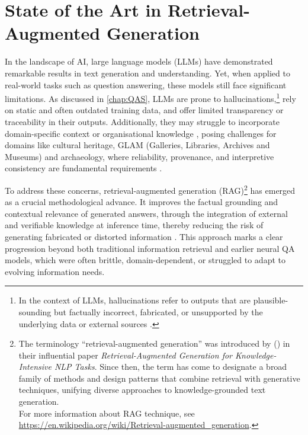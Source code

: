 \chapter{State of the Art in Retrieval-Augmented Generation}
\label{chap:sota}
\begin{spacing}{1.5}
\sloppy
In the landscape of AI, large language models (LLMs) have demonstrated remarkable results in text generation and understanding. Yet, when applied to real-world tasks such as question answering, these models still face significant limitations. As discussed in \autoref{chap:QAS}, LLMs are prone to hallucinations,\footnote{In the context of LLMs, hallucinations refer to outputs that are plausible-sounding but factually incorrect, fabricated, or unsupported by the underlying data or external sources \citep{harsh_comprehending_2024}.} rely on static and often outdated training data, and offer limited transparency or traceability in their outputs. Additionally, they may struggle to incorporate domain-specific context or organisational knowledge \citep{vaibhav_retrieval-augmented_2025}, posing challenges for domains like cultural heritage, GLAM (Galleries, Libraries, Archives and Museums) and archaeology, where reliability, provenance, and interpretive consistency are fundamental requirements \citep{di_marcantonio_intelligenza_2024}.

To address these concerns, retrieval-augmented generation (RAG)\footnote{The terminology ``retrieval-augmented generation'' was introduced by \citeauthor{lewis_retrieval-augmented_2020} (\citeyear{lewis_retrieval-augmented_2020}) in their influential paper \textit{Retrieval-Augmented Generation for Knowledge-Intensive NLP Tasks}. Since then, the term has come to designate a broad family of methods and design patterns that combine retrieval with generative techniques, unifying diverse approaches to knowledge-grounded text generation.\\ For more information about RAG technique, see \url{https://en.wikipedia.org/wiki/Retrieval-augmented_generation}.} has emerged as a crucial methodological advance. It improves the factual grounding and contextual relevance of generated answers, through the integration of external and verifiable knowledge at inference time, thereby reducing the risk of generating fabricated or distorted information \citep{martineau_what_2023}. This approach marks a clear progression beyond both traditional information retrieval and earlier neural QA models, which were often brittle, domain-dependent, or struggled to adapt to evolving information needs.


\end{spacing}

